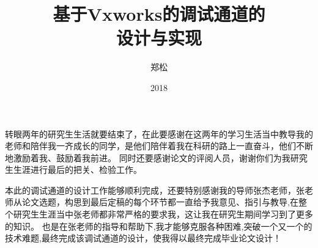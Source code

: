 \documentclass[format=draft,language=chinese,degree=master]{hustthesis}
\title{基于Vxworks的调试通道的\\
设计与实现}{A design and implementation of debug channel based on Vxworks.}
\author{郑松}{Song Zheng}
\date{2018}{3}{26}
\begin{document}
\frontmatter

\maketitle


\makeabstract

\tableofcontents


\mainmatter

\clearpage


\clearpage


\clearpage


\clearpage


\clearpage


\clearpage

\backmatter

\begin{ack}
\indent 转眼两年的研究生生活就要结束了，在此要感谢在这两年的学习生活当中教导我的老师和陪伴我一齐成长的同学，是他们陪伴着我在科研的路上一直奋斗，他们不断地激励着我、鼓励着我前进。
同时还要感谢论文的评阅人员，谢谢你们为我研究生生涯进行最后的把关、检验工作。


\noindent 本此的调试通道的设计工作能够顺利完成，还要特别感谢我的导师张杰老师，张老师从论文选题，构思到最后定稿的每个环节都一直给予我意见、指引与教导,在整个研究生生涯当中张老师都非常严格的要求我，这让我在研究生期间学习到了更多的知识。
也是在张老师的指导和帮助下,我才能够克服各种困难,突破一个又一个的技术难题,最终完成该调试通道的设计，使我得以最终完成毕业论文设计！
\end{ack}

\nocite{*}
% 

\end{document}
